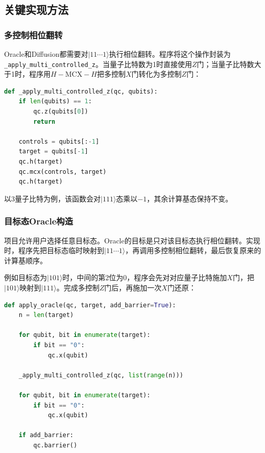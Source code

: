 \subsection{关键实现方法}

\subsubsection{多控制相位翻转}

Oracle和Diffusion都需要对\(|11\cdots 1\rangle\)执行相位翻转。程序将这个操作封装为\texttt{\_apply\_multi\_controlled\_z}。当量子比特数为1时直接使用\(Z\)门；当量子比特数大于1时，程序用\(H-\mathrm{MCX}-H\)把多控制\(X\)门转化为多控制\(Z\)门：

\begin{lstlisting}[language=Python]
def _apply_multi_controlled_z(qc, qubits):
    if len(qubits) == 1:
        qc.z(qubits[0])
        return

    controls = qubits[:-1]
    target = qubits[-1]
    qc.h(target)
    qc.mcx(controls, target)
    qc.h(target)
\end{lstlisting}

以3量子比特为例，该函数会对\(|111\rangle\)态乘以\(-1\)，其余计算基态保持不变。

\subsubsection{目标态Oracle构造}

项目允许用户选择任意目标态。Oracle的目标是只对该目标态执行相位翻转。实现时，程序先把目标态临时映射到\(|11\cdots 1\rangle\)，再调用多控制相位翻转，最后恢复原来的计算基顺序。

例如目标态为\(|101\rangle\)时，中间的第2位为0，程序会先对对应量子比特施加\(X\)门，把\(|101\rangle\)映射到\(|111\rangle\)。完成多控制\(Z\)门后，再施加一次\(X\)门还原：

\begin{lstlisting}[language=Python]
def apply_oracle(qc, target, add_barrier=True):
    n = len(target)

    for qubit, bit in enumerate(target):
        if bit == "0":
            qc.x(qubit)

    _apply_multi_controlled_z(qc, list(range(n)))

    for qubit, bit in enumerate(target):
        if bit == "0":
            qc.x(qubit)

    if add_barrier:
        qc.barrier()
\end{lstlisting}

